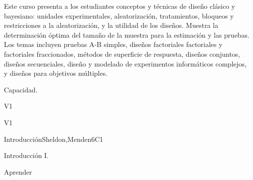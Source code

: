 
\begin{syllabus}


\begin{justification}
Este curso presenta a los estudiantes conceptos y técnicas de diseño clásico y bayesiano: unidades experimentales, aleatorización, tratamientos, bloqueos y restricciones a la aleatorización, y la utilidad de los diseños. Muestra  la determinación óptima del tamaño de la muestra para la estimación y las pruebas. Los temas incluyen pruebas A-B simples, diseños factoriales factoriales y factoriales fraccionados, métodos de superficie de respuesta, diseños conjuntos, diseños secuenciales, diseño y modelado de experimentos informáticos complejos, y diseños para objetivos múltiples. 
\end{justification}

\begin{goals}
\item Capacidad.
\end{goals}

\begin{outcomes}{V1}
   \item {}
\end{outcomes}

\begin{competences}{V1}
    \item {} 
\end{competences}


\begin{unit}{Introducción}{}{Sheldon,Menden}{6}{C1}
\begin{topics}
      \item Introducción I.
   \end{topics}

   \begin{learningoutcomes}
      \item Aprender
   \end{learningoutcomes}
\end{unit}





\begin{coursebibliography}
\end{coursebibliography}

\end{syllabus}
